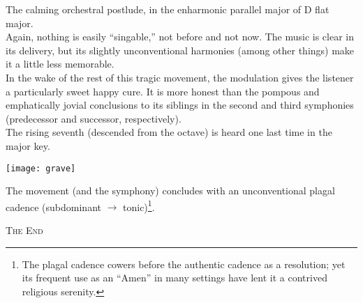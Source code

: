 \documentclass{beamer}
\begin{document}
\begin{frame}
  The calming orchestral postlude, in the enharmonic parallel major of D flat major. 
  \pause \\
  Again, nothing is easily ``singable,'' not before and not now. The music is clear in its delivery, but its slightly unconventional harmonies (among other things) make it a little less memorable. 
  \pause \\
  In the wake of the rest of this tragic movement, the modulation gives the listener a particularly sweet happy cure. It is more honest than the pompous and emphatically jovial conclusions to its siblings in the second and third symphonies (predecessor and successor, respectively). 
  \pause \\
  The rising seventh (descended from the octave) is heard one last time in the major key. 
\end{frame} 

\begin{frame} 
  \begin{center}
    \texttt{[image: grave]} 
  \end{center} 
  The movement (and the symphony) concludes with an unconventional plagal cadence (subdominant \(\to\) tonic)\footnote{The plagal cadence cowers before the authentic cadence as a resolution; yet its frequent use as an ``Amen'' in many settings have lent it a contrived religious serenity.}. 
\end{frame} 

\begin{frame}
  \begin{center} 
    {\Large\textsc{The End} } 
  \end{center} 
\end{frame} 
\end{document}
